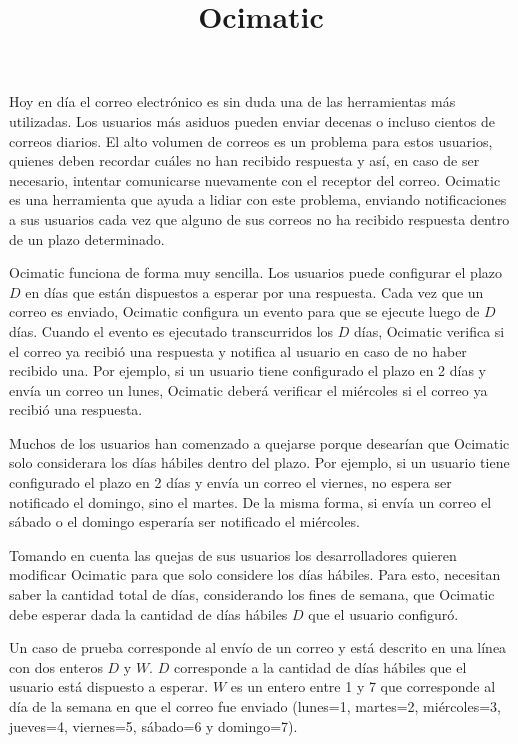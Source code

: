 \documentclass{oci}
\title{Ocimatic}
\begin{document}
\begin{problemDescription}
  Hoy en día el correo electrónico es sin duda una de las herramientas más
  utilizadas.
  Los usuarios más asiduos pueden enviar decenas o incluso cientos de correos
  diarios.
  El alto volumen de correos es un problema para estos usuarios, quienes deben
  recordar cuáles no han recibido respuesta y así, en caso de ser necesario,
  intentar comunicarse nuevamente con el receptor del correo.
  Ocimatic es una herramienta que ayuda a lidiar con este problema, enviando
  notificaciones a sus usuarios cada vez que alguno de sus correos no ha
  recibido respuesta dentro de un plazo determinado.
  
  Ocimatic funciona de forma muy sencilla.
  Los usuarios puede configurar el plazo $D$ en días que están dispuestos a
  esperar por una respuesta.
  Cada vez que un correo es enviado, Ocimatic configura un evento para que se
  ejecute luego de $D$ días.
  Cuando el evento es ejecutado transcurridos los $D$ días, Ocimatic verifica
  si el correo ya recibió una respuesta y notifica al usuario en caso de no
  haber recibido una.
  Por ejemplo, si un usuario tiene configurado el plazo en 2 días y envía un
  correo un lunes, Ocimatic deberá verificar el miércoles si el correo ya recibió
  una respuesta.

  Muchos de los usuarios han comenzado a quejarse porque desearían que Ocimatic
  solo considerara los días hábiles dentro del plazo.
  Por ejemplo, si un usuario tiene configurado el plazo en 2 días y envía un
  correo el viernes, no espera ser notificado el domingo, sino el martes.
  De la misma forma, si envía un correo el sábado o el domingo esperaría ser
  notificado el miércoles.

  Tomando en cuenta las quejas de sus usuarios los desarrolladores quieren
  modificar Ocimatic para que solo considere los días hábiles.
  Para esto, necesitan saber la cantidad total de días, considerando los fines
  de semana, que Ocimatic debe esperar dada la cantidad de días hábiles $D$ que
  el usuario configuró.
\end{problemDescription}

\begin{inputDescription}
  Un caso de prueba corresponde al envío de un correo y está descrito en una
  línea con dos enteros $D$ y $W$.
  $D$ corresponde a la cantidad de días hábiles que el usuario está dispuesto a
  esperar.
  $W$ es un entero entre 1 y 7 que corresponde al día de la semana en que el
  correo fue enviado (lunes=1, martes=2, miércoles=3, jueves=4, viernes=5,
  sábado=6 y domingo=7).
\end{inputDescription}
\end{document}
